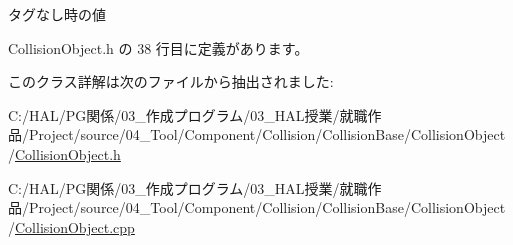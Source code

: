 タグなし時の値 



 Collision\+Object.\+h の 38 行目に定義があります。



このクラス詳解は次のファイルから抽出されました\+:\begin{DoxyCompactItemize}
\item 
C\+:/\+H\+A\+L/\+P\+G関係/03\+\_\+作成プログラム/03\+\_\+\+H\+A\+L授業/就職作品/\+Project/source/04\+\_\+\+Tool/\+Component/\+Collision/\+Collision\+Base/\+Collision\+Object/\mbox{\hyperlink{_collision_object_8h}{Collision\+Object.\+h}}\item 
C\+:/\+H\+A\+L/\+P\+G関係/03\+\_\+作成プログラム/03\+\_\+\+H\+A\+L授業/就職作品/\+Project/source/04\+\_\+\+Tool/\+Component/\+Collision/\+Collision\+Base/\+Collision\+Object/\mbox{\hyperlink{_collision_object_8cpp}{Collision\+Object.\+cpp}}\end{DoxyCompactItemize}
